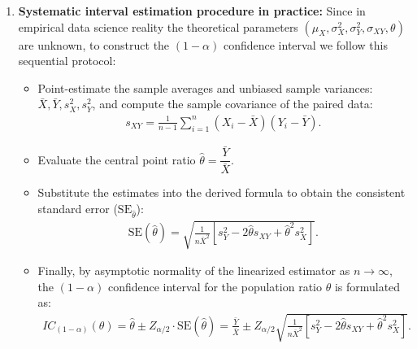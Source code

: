 \begin{solproblema}
\begin{enumerate}
		\begin{align}
			\Var(\bar{X}) = \frac{\sigma_X^2}{n}, \quad \Var(\bar{Y}) = \frac{\sigma_Y^2}{n}, \quad \cov(\bar{X}, \bar{Y}) = \frac{\sigma_{XY}}{n}.
		\end{align}
		Substituting these sampling variances into the equation and factoring out $1 / (n \mu_X^2)$:
		\begin{align}
			\Var(\hat{\theta}) \approx \frac{\theta^2}{\mu_X^2} \left( \frac{\sigma_X^2}{n} \right) + \frac{1}{\mu_X^2} \left( \frac{\sigma_Y^2}{n} \right) - \frac{2\theta}{\mu_X^2} \left( \frac{\sigma_{XY}}{n} \right) = \frac{1}{n \mu_X^2} \left[ \sigma_Y^2 - 2\theta \sigma_{XY} + \theta^2 \sigma_X^2 \right].
		\end{align}
		This formally proves the fundamental result of the Delta Method for algebraic ratios of averages.
		
		\item \textbf{Systematic interval estimation procedure in practice:}
		Since in empirical data science reality the theoretical parameters $(\mu_X, \sigma_X^2, \sigma_Y^2, \sigma_{XY}, \theta)$ are unknown, to construct the $(1-\alpha)$ confidence interval we follow this sequential protocol:
		\begin{itemize}
			\item Point-estimate the sample averages and unbiased sample variances: $\bar{X}, \bar{Y}, s_X^2, s_Y^2$, and compute the sample covariance of the paired data:
			\begin{align}
				s_{XY} = \frac{1}{n-1} \sum_{i=1}^n (X_i - \bar{X})(Y_i - \bar{Y}).
			\end{align}
			\item Evaluate the central point ratio $\hat{\theta} = \dfrac{\bar{Y}}{\bar{X}}$.
			\item Substitute the estimates into the derived formula to obtain the consistent standard error ($\text{SE}_{\hat{\theta}}$):
			\begin{align}
				\text{SE}(\hat{\theta}) = \sqrt{ \frac{1}{n \bar{X}^2} \left[ s_Y^2 - 2\hat{\theta} s_{XY} + \hat{\theta}^2 s_X^2 \right] }.
			\end{align}
			\item Finally, by asymptotic normality of the linearized estimator as $n \to \infty$, the $(1-\alpha)$ confidence interval for the population ratio $\theta$ is formulated as:
			\begin{align}
				IC_{(1-\alpha)}(\theta) = \hat{\theta} \pm Z_{\alpha/2} \cdot \text{SE}(\hat{\theta}) = \frac{\bar{Y}}{\bar{X}} \pm Z_{\alpha/2} \sqrt{ \frac{1}{n \bar{X}^2} \left[ s_Y^2 - 2\hat{\theta} s_{XY} + \hat{\theta}^2 s_X^2 \right] }.
			\end{align}
		\end{itemize}
	\end{enumerate}
\end{solproblema}
